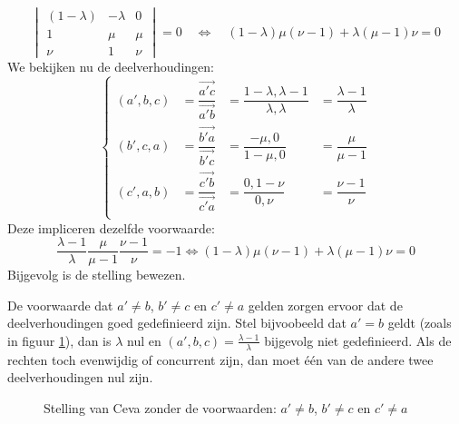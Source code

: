 \documentclass[main.tex]{subfiles}
\begin{document}
\begin{st}
\[\begin{vmatrix}
    (1-\lambda) & -\lambda & 0 \\
    1 & \mu & \mu \\
    \nu & 1 & \nu
  \end{vmatrix}
  = 0
  \quad\Leftrightarrow\quad
  (1 - \lambda)\mu(\nu-1) + \lambda(\mu-1)\nu = 0
  \]
  We bekijken nu de deelverhoudingen:
  \[
  \left\{
  \begin{array}{rlll}
  (a',b,c) &= \dfrac{\overrightarrow{a'c}}{\overrightarrow{a'b}} &= \dfrac{1-\lambda,\lambda-1}{\lambda,\lambda} &= \dfrac{\lambda-1}{\lambda}\\
  (b',c,a) &= \dfrac{\overrightarrow{b'a}}{\overrightarrow{b'c}} &= \dfrac{-\mu,0}{1-\mu,0} &= \dfrac{\mu}{\mu-1}\\
  (c',a,b) &= \dfrac{\overrightarrow{c'b}}{\overrightarrow{c'a}} &= \dfrac{0,1-\nu}{0,\nu} &= \dfrac{\nu -1}{\nu}\\
  \end{array}
  \right.
  \]
  Deze impliceren dezelfde voorwaarde:
  \[
  \dfrac{\lambda-1}{\lambda}\dfrac{\mu}{\mu-1}\dfrac{\nu -1}{\nu} = -1
  \Leftrightarrow
  (1 - \lambda)\mu(\nu-1) + \lambda(\mu-1)\nu = 0
  \]
  Bijgevolg is de stelling bewezen.
\end{st}

\begin{opm}
  De voorwaarde dat $a' \neq b$, $b' \neq c$ en $c' \neq a$ gelden zorgen ervoor dat de deelverhoudingen goed gedefinieerd zijn.
  Stel bijvoobeeld dat $a'=b$ geldt (zoals in figuur \ref{fig:stelling-van-ceva-alternatief}), dan is $\lambda$ nul en $(a',b,c) = \frac{\lambda-1}{\lambda}$ bijgevolg niet gedefinieerd.
  Als de rechten toch evenwijdig of concurrent zijn, dan moet \'e\'en van de andere twee deelverhoudingen nul zijn.
  \begin{figure}[H]
    \centering
    \caption{Stelling van Ceva zonder de voorwaarden: $a' \neq b$, $b' \neq c$ en $c' \neq a$}
    \label{fig:stelling-van-ceva-alternatief}
  \end{figure}
\end{opm}
\end{document}
